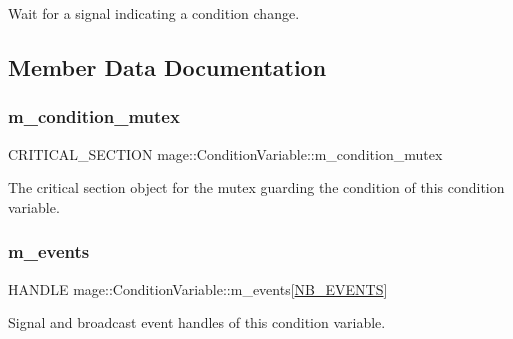 Wait for a signal indicating a condition change. 

\subsection{Member Data Documentation}
\hypertarget{classmage_1_1_condition_variable_ab5ff870b2881a1979ccaec986d762441}{}\label{classmage_1_1_condition_variable_ab5ff870b2881a1979ccaec986d762441} 
\subsubsection{\texorpdfstring{m\+\_\+condition\+\_\+mutex}{m\_condition\_mutex}}
{\footnotesize\ttfamily C\+R\+I\+T\+I\+C\+A\+L\+\_\+\+S\+E\+C\+T\+I\+ON mage\+::\+Condition\+Variable\+::m\+\_\+condition\+\_\+mutex\hspace{0.3cm}{\ttfamily [private]}}

The critical section object for the mutex guarding the condition of this condition variable. \hypertarget{classmage_1_1_condition_variable_ac61c3440af244ec43d2ad53026ec9de4}{}\label{classmage_1_1_condition_variable_ac61c3440af244ec43d2ad53026ec9de4} 
\subsubsection{\texorpdfstring{m\+\_\+events}{m\_events}}
{\footnotesize\ttfamily H\+A\+N\+D\+LE mage\+::\+Condition\+Variable\+::m\+\_\+events\mbox{[}\hyperlink{classmage_1_1_condition_variable_a14e9d213c294cc47b3341fccaf6b48e5abc7182486d437f413ac9c77ae0bfdac1}{N\+B\+\_\+\+E\+V\+E\+N\+TS}\mbox{]}\hspace{0.3cm}{\ttfamily [private]}}

Signal and broadcast event handles of this condition variable. \hypertarget{classmage_1_1_condition_variable_ac02cb14000a597ec91b8546bdcbb9dd1}{}\label{classmage_1_1_condition_variable_ac02cb14000a597ec91b8546bdcbb9dd1} 
